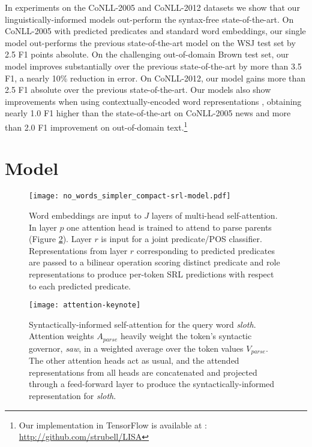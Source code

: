 \documentclass[11pt,a4paper]{article}
\begin{document}
In experiments on the CoNLL-2005 and CoNLL-2012 datasets we show that our linguistically-informed models out-perform the syntax-free state-of-the-art. On CoNLL-2005 with predicted predicates and standard word embeddings, our single model out-performs the previous state-of-the-art model on the WSJ test set by 2.5 F1 points absolute. On the challenging out-of-domain Brown test set, our model improves substantially over the previous state-of-the-art by more than 3.5 F1, a nearly 10\% reduction in error. On CoNLL-2012, our model gains more than 2.5 F1 absolute over the previous state-of-the-art. Our models also show improvements when using contextually-encoded word representations \citep{peters2018deep}, obtaining nearly 1.0 F1 higher than the state-of-the-art on CoNLL-2005 news and more than 2.0 F1 improvement on out-of-domain text.\footnote{Our implementation in TensorFlow \citep{abadi2015tensorflow} is available at : \protect\url{http://github.com/strubell/LISA}}

\section{Model}

\begin{figure}[t]
\begin{center}
\texttt{[image: no\_words\_simpler\_compact-srl-model.pdf]}
\caption{Word embeddings are input to $J$ layers of multi-head self-attention. In layer $p$ one attention head is trained to attend to parse parents (Figure \ref{attention-fig}). Layer $r$ is input for a joint predicate/POS classifier. Representations from layer $r$ corresponding to predicted predicates are passed to  a bilinear operation scoring distinct predicate and role representations to produce per-token SRL predictions with respect to each predicted predicate.\label{architecture-fig}}
\end{center}
\end{figure}

\begin{figure}[t]
\begin{center}
\texttt{[image: attention-keynote]}
\caption{Syntactically-informed self-attention for the query word \emph{sloth}. Attention weights $A_{parse}$ heavily weight the token's syntactic governor, \emph{saw}, in a weighted average over the token values $V_{parse}$. The other attention heads act as usual, and the attended representations from all heads are concatenated and projected through a feed-forward layer to produce the syntactically-informed representation for \emph{sloth}. \label{attention-fig}}
\end{center}
\end{figure}
\end{document}
